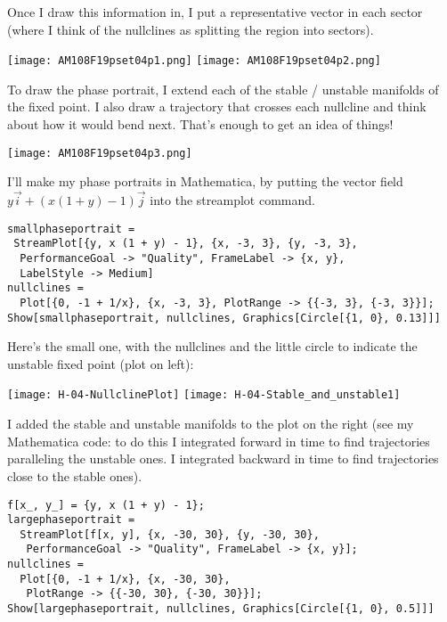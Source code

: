 \documentclass[12pt,letterpaper,answers]{exam}
\begin{document}
\begin{questions}
\begin{parts}
\begin{solution}
Once I draw this information in, I put a representative vector in each sector (where I think of the nullclines as splitting the region into sectors).

\texttt{[image: AM108F19pset04p1.png]}
\texttt{[image: AM108F19pset04p2.png]}

To draw the phase portrait, I extend each of the stable / unstable manifolds of the fixed point.  I also draw a trajectory that crosses each nullcline and think about how it would bend next.  That's enough to get an idea of things!

\texttt{[image: AM108F19pset04p3.png]}

\end{solution}


\item 
\begin{solution}
I'll make my phase portraits in Mathematica, by putting the vector field $y\vec i + (x(1+y)-1)\vec j$ into the streamplot command.

\begin{verbatim}
smallphaseportrait = 
 StreamPlot[{y, x (1 + y) - 1}, {x, -3, 3}, {y, -3, 3}, 
  PerformanceGoal -> "Quality", FrameLabel -> {x, y}, 
  LabelStyle -> Medium]
nullclines = 
  Plot[{0, -1 + 1/x}, {x, -3, 3}, PlotRange -> {{-3, 3}, {-3, 3}}];
Show[smallphaseportrait, nullclines, Graphics[Circle[{1, 0}, 0.13]]]
\end{verbatim}

Here's the small one, with the nullclines and the little circle to indicate the unstable fixed point (plot on left):

\texttt{[image: H-04-NullclinePlot]} 
\texttt{[image: H-04-Stable\_and\_unstable1]}

I added the stable and unstable manifolds to the plot on the right (see my Mathematica code: to do this I integrated forward in time to find trajectories paralleling the unstable ones.  I integrated backward in time to find trajectories close to the stable ones).




\begin{verbatim}
f[x_, y_] = {y, x (1 + y) - 1};
largephaseportrait = 
  StreamPlot[f[x, y], {x, -30, 30}, {y, -30, 30}, 
   PerformanceGoal -> "Quality", FrameLabel -> {x, y}];
nullclines = 
  Plot[{0, -1 + 1/x}, {x, -30, 30}, 
   PlotRange -> {{-30, 30}, {-30, 30}}];
Show[largephaseportrait, nullclines, Graphics[Circle[{1, 0}, 0.5]]]
\end{verbatim}


\end{solution}
\end{parts}
\end{questions}
\end{document}
